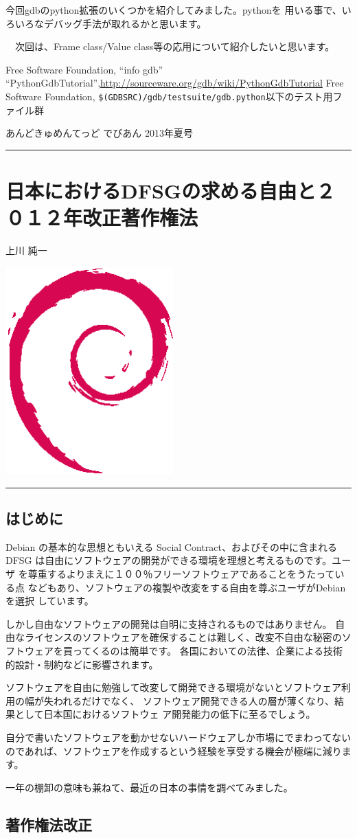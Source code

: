 \documentclass[mingoth,a4paper]{jsarticle}
\renewcommand{\dancersection}[2]{%
\newpage
あんどきゅめんてっど でびあん 2013年夏号
%
\vspace{0.1mm}\\
{\color{dancerdarkblue}\rule{\hsize}{2mm}}

%
%
\begin{minipage}[t]{0.6\hsize}
\color{dancerdarkblue}
\vspace{1cm}
\section{#1}
\hfill{}#2\\
\end{minipage}
\begin{minipage}[t]{0.4\hsize}
\vspace{-2cm}
\hfill{}\includegraphics[height=8cm]{image200502/openlogo-nd.eps}\\
\vspace{-5cm}
\end{minipage}
%
{\color{dancerlightblue}\rule{0.66\hsize}{2mm}}
%
\vspace{2cm}
}
\begin{document}
 今回gdbのpython拡張のいくつかを紹介してみました。pythonを
用いる事で、いろいろなデバッグ手法が取れるかと思います。

　次回は、Frame class/Value class等の応用について紹介したいと思います。

\begin{thebibliography}{98}
 Free Software Foundation, ``info gdb''
 ``PythonGdbTutorial'',\url{http://sourceware.org/gdb/wiki/PythonGdbTutorial}
 Free Software Foundation, \verb!$(GDBSRC)/gdb/testsuite/gdb.python!以下のテスト用ファイル群
\end{thebibliography}

\dancersection{日本におけるDFSGの求める自由と２０１２年改正著作権法}{上川 純一}

\subsection{はじめに}

Debian の基本的な思想ともいえる Social Contract、およびその中に含まれる
DFSG は自由にソフトウェアの開発ができる環境を理想と考えるものです。ユーザ
を尊重するよりまえに１００％フリーソフトウェアであることをうたっている点
などもあり、ソフトウェアの複製や改変をする自由を尊ぶユーザがDebianを選択
しています。

しかし自由なソフトウェアの開発は自明に支持されるものではありません。
自由なライセンスのソフトウェアを確保することは難しく、改変不自由な秘密のソフトウェアを買ってくるのは簡単です。
各国においての法律、企業による技術的設計・制約などに影響されます。

ソフトウェアを自由に勉強して改変して開発できる環境がないとソフトウェア利
用の幅が失われるだけでなく、
ソフトウェア開発できる人の層が薄くなり、結果として日本国におけるソフトウェ
ア開発能力の低下に至るでしょう。

自分で書いたソフトウェアを動かせないハードウェアしか市場にでまわってない
のであれば、ソフトウェアを作成するという経験を享受する機会が極端に減ります。

一年の棚卸の意味も兼ねて、最近の日本の事情を調べてみました。

\subsection{著作権法改正}
\end{document}
